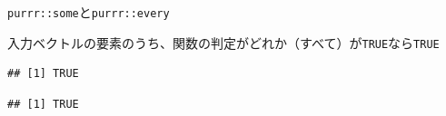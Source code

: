 \documentclass[ignorenonframetext,]{beamer}
\newenvironment{Shaded}{\begin{snugshade}}{\end{snugshade}}
\newcommand{\KeywordTok}[1]{\textcolor[rgb]{0.13,0.29,0.53}{\textbf{#1}}}
\newcommand{\DecValTok}[1]{\textcolor[rgb]{0.00,0.00,0.81}{#1}}
\newcommand{\StringTok}[1]{\textcolor[rgb]{0.31,0.60,0.02}{#1}}
\newcommand{\OperatorTok}[1]{\textcolor[rgb]{0.81,0.36,0.00}{\textbf{#1}}}
\newcommand{\NormalTok}[1]{#1}
\begin{document}
\begin{frame}[fragile]{\texttt{purrr::some}と\texttt{purrr::every}}

入力ベクトルの要素のうち、関数の判定がどれか（すべて）が\texttt{TRUE}なら\texttt{TRUE}

\begin{Shaded}
\end{Shaded}

\begin{verbatim}
## [1] TRUE
\end{verbatim}

\begin{Shaded}
\end{Shaded}

\begin{verbatim}
## [1] TRUE
\end{verbatim}

\end{frame}
\end{document}
